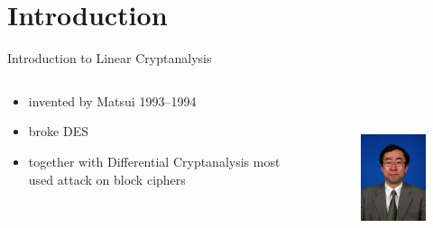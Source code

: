 \section{Introduction}
\begin{frame}{Introduction to Linear Cryptanalysis}
	\begin{columns}[T]
		\begin{column}{.58\textwidth}
			\begin{itemize}
				\item invented by Matsui 1993--1994
				\item broke DES
				\item together with Differential Cryptanalysis
						most used attack on block ciphers
			\end{itemize}
		\end{column}
		\hfill
		\begin{column}{.38\textwidth}
			\begin{figure}[!ht]
				\includegraphics[height=50mm]{data/matsui.jpg}
			\end{figure}
		\end{column}
	\end{columns}
\end{frame}

